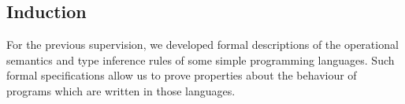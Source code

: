 \documentclass[10pt,a4paper]{exam}
\begin{document}
\begin{questions}

\section*{Induction}

\question For the previous supervision, we developed formal descriptions of the operational semantics and type inference rules of some simple programming languages. Such formal specifications allow us to prove properties about the behaviour of programs which are written in those languages. 
\begin{parts}

\end{parts}
\end{questions}
\end{document}
